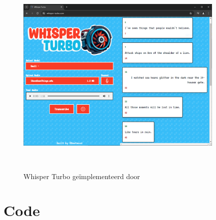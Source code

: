 \documentclass[dutch,dit,thesis]{hogentreport}
\begin{document}
\begin{figure}
    \centering
    \captionsetup{justification=centering}
    \includegraphics[width=10cm,height=10cm,keepaspectratio]{WhisperTurbo.PNG}
    \caption[Whisper Turbo~\autocite{Fleetwood2023b}]{
        Whisper Turbo geïmplementeerd door \textcite{Fleetwood2023b}
    }
    \label{fig:Whisper Turbo}
\end{figure}

\chapter{Code}


\end{document}
